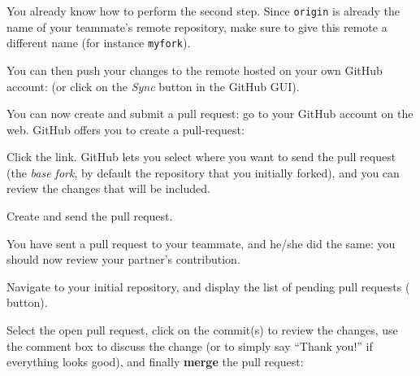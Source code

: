 \documentclass{instructions}
\begin{document}
You already know how to perform the second step. Since \texttt{origin} is
already the name of your teammate's remote repository, make sure to give this
remote a different name (for instance \texttt{myfork}).



You can then push your changes to the remote hosted on your own GitHub account:
 (or click on the \emph{Sync} button in the GitHub GUI).

You can now create and submit a pull request: go to your GitHub account on the
web. GitHub offers you to create a pull-request:

\begin{center}
\end{center}

Click the link. GitHub lets you select where you want to send the pull request
(the \emph{base fork}, by default the repository that you initially forked), and
you can review the changes that will be included.


\begin{center}
\end{center}

Create and send the pull request.


You have sent a pull request to your teammate, and he/she did the same: you
should now review your partner's contribution.

Navigate to your initial repository, and display the list of pending pull
requests (
button).

Select the open pull request, click on the commit(s) to review the changes, use the
comment box to discuss the change (or to simply say ``Thank you!'' if everything
looks good), and finally \textbf{merge} the pull request:
\end{document}
